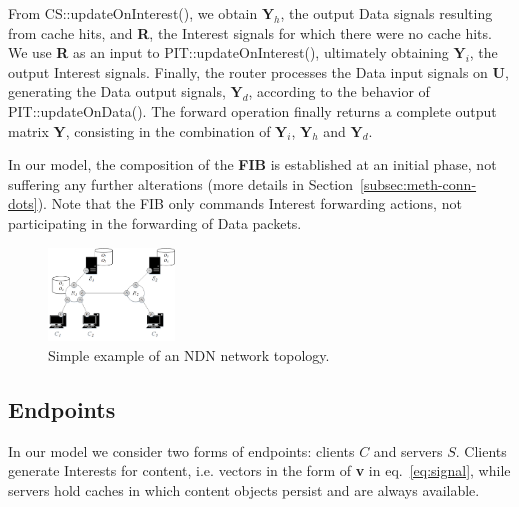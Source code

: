 From CS::updateOnInterest(), we obtain $\textbf{Y}_h$, the output Data signals 
resulting from cache hits, and \textbf{R}, the Interest signals for which 
there were no cache hits. We use \textbf{R} as an input to PIT::updateOnInterest(), 
ultimately obtaining $\textbf{Y}_i$, the output Interest signals. Finally, 
the router processes the Data input signals on \textbf{U}, generating the 
Data output signals, $\textbf{Y}_d$, according to the behavior of 
PIT::updateOnData(). The forward operation finally returns a complete output 
matrix \textbf{Y}, consisting in the combination of 
$\textbf{Y}_i$, $\textbf{Y}_h$ and $\textbf{Y}_d$.\shortvertbreak

In our model, the composition of the \textbf{FIB} is established at an initial phase, 
not suffering any further alterations (more details in 
Section~\ref{subsec:meth-conn-dots}). Note 
that the FIB only commands Interest forwarding actions, not participating in the 
forwarding of Data packets.

\begin{figure}[h!]

    \centering
    \includegraphics[width=0.30\textwidth]{figures/fib-topo.png}
    \cprotect\caption{Simple example of an NDN network topology.}
    \label{fig:fib-topo}

\end{figure}

\subsection{Endpoints}
\label{subsec:meth-endpoints}

In our model we consider two forms of endpoints: clients $C$ and servers $S$. 
Clients generate Interests for content, i.e. vectors in the form of \textbf{v} 
in eq.~\ref{eq:signal}, while servers hold caches in which content objects persist 
and are always available.\shortvertbreak

